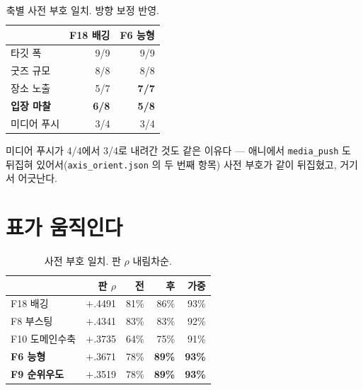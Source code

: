 \documentclass[10pt]{article}
\begin{document}

\begin{table}[t]
\centering\tsize
\caption{축별 사전 부호 일치. 방향 보정 반영.}
\begin{tabular}{lrr}
\toprule
& F18 배깅 & F6 능형 \\
\midrule
타깃 폭 & 9/9 & 9/9 \\
굿즈 규모 & 8/8 & 8/8 \\
장소 노출 & 5/7 & \textbf{7/7} \\
\textbf{입장 마찰} & \textbf{6/8} & \textbf{5/8} \\
미디어 푸시 & 3/4 & 3/4 \\
\bottomrule
\end{tabular}
\end{table}

미디어 푸시가 4/4에서 3/4로 내려간 것도 같은 이유다 --- 애니에서
\texttt{media\_push} 도 뒤집혀 있어서(\texttt{axis\_orient.json} 의 두 번째
항목) 사전 부호가 같이 뒤집혔고, 거기서 어긋난다.

\section{표가 움직인다}

\begin{table}[t]
\centering\tsize
\caption{사전 부호 일치. 판 $\rho$ 내림차순.}
\begin{tabular}{lrrrr}
\toprule
& 판 $\rho$ & 전 & \textbf{후} & 가중 \\
\midrule
F18 배깅 & $+$.4491 & 81\% & 86\% & 93\% \\
F8 부스팅 & $+$.4341 & 83\% & 83\% & 92\% \\
F10 도메인수축 & $+$.3735 & 64\% & 75\% & 91\% \\
\textbf{F6 능형} & $+$.3671 & 78\% & \textbf{89\%} & \textbf{93\%} \\
\textbf{F9 순위우도} & $+$.3519 & 78\% & \textbf{89\%} & \textbf{93\%} \\
\bottomrule
\end{tabular}
\end{table}

\end{document}
